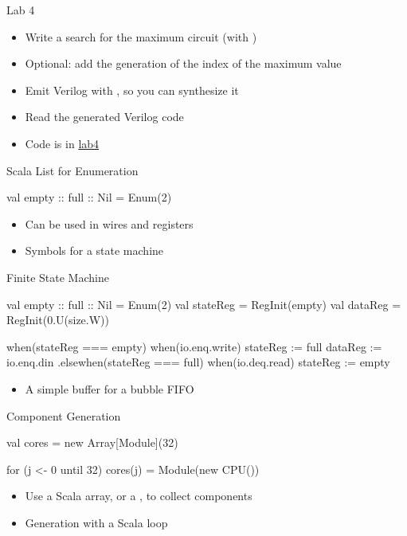 \begin{frame}[fragile]{Lab 4}
\begin{itemize}
\item Write a search for the maximum circuit (with )
\item Optional: add the generation of the index of the maximum value
\item Emit Verilog with , so you can synthesize it
\item Read the generated Verilog code
\item Code is in \href{https://github.com/schoeberl/agile-hw/tree/main/lab4}{lab4}
\end{itemize}
\end{frame}




\begin{frame}[fragile]{Scala List for Enumeration}
\begin{chisel}
  val empty :: full :: Nil = Enum(2)
\end{chisel}
\begin{itemize}
\item Can be used in wires and registers
\item Symbols for a state machine
\end{itemize}
\end{frame}

\begin{frame}[fragile]{Finite State Machine}
\begin{chisel}
  val empty :: full :: Nil = Enum(2)
  val stateReg = RegInit(empty)
  val dataReg = RegInit(0.U(size.W))

  when(stateReg === empty) {
    when(io.enq.write) {
      stateReg := full
      dataReg := io.enq.din
    }
  }.elsewhen(stateReg === full) {
    when(io.deq.read) {
      stateReg := empty
    }
  }
\end{chisel}
\begin{itemize}
\item A simple buffer for a bubble FIFO
\end{itemize}
\end{frame}

\begin{frame}[fragile]{Component Generation}
\begin{chisel}
val cores = new Array[Module](32)

for (j <- 0 until 32)
  cores(j) = Module(new CPU())
\end{chisel}
\begin{itemize}
\item Use a Scala array, or a , to collect components
\item Generation with a Scala loop
\end{itemize}
\end{frame}


